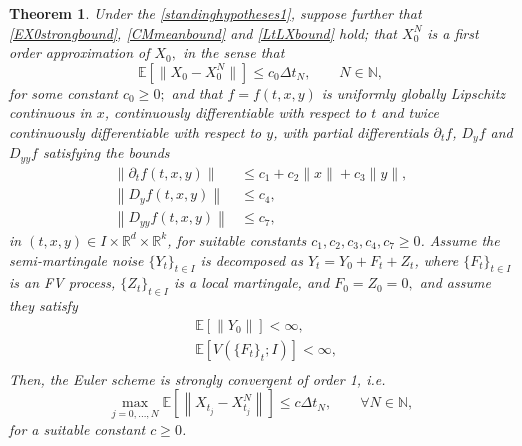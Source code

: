 \documentclass[reqno,12pt]{amsart}
\theoremstyle{plain} %
\newtheorem{theorem}{Theorem}[section]
\theoremstyle{definition} %
\begin{document}
\begin{theorem}
    \label{thmsemimartingale}
    Under the \cref{standinghypotheses1}, suppose further that \eqref{EX0strongbound}, \eqref{CMmeanbound} and \eqref{LtLXbound} hold; that $X_0^N$ is a first order approximation of $X_0,$ in the sense that 
    \begin{equation}
        \label{EX0X0Nunif}
        \mathbb{E}[\|X_0 - X_0^N\|] \leq c_0 \Delta t_N, \qquad N\in \mathbb{N},
    \end{equation}
    for some constant $c_0 \geq 0;$ and that $f=f(t, x, y)$ is uniformly globally Lipschitz continuous in $x$, continuously differentiable with respect to $t$ and twice continuously differentiable with respect to $y$, with partial differentials $\partial_t f$, $D_y f$ and $D_{yy} f$ satisfying the bounds
    \begin{align}
        \label{ftfyunifboundcadlagfvpartialt}
        \left\|\partial_t f(t, x, y)\right\| & \leq c_1 + c_2\|x\| + c_3\|y\|, \\
        \label{ftfyunifboundcadlagfvpartialy}
        \left\|D_y f(t, x, y)\right\| & \leq c_4, \\
        \label{ftfyunifboundcadlagfvpartialyy}
        \left\|D_{yy} f(t, x, y)\right\| & \leq c_7,
    \end{align}
    in $(t, x, y)\in I\times \mathbb{R}^d\times \mathbb{R}^k$, for suitable constants $c_1, c_2, c_3, c_4, c_7 \geq 0$. Assume the semi-martingale noise $\{Y_t\}_{t\in I}$ is decomposed as $Y_t = Y_0 + F_t + Z_t$, where $\{F_t\}_{t\in I}$ is an FV process, $\{Z_t\}_{t\in I}$ is a local martingale, and $F_0 = Z_0 = 0,$ and assume they satisfy
    \begin{align}
        \label{Y0finiteexpectation}
        & \mathbb{E}\left[\|Y_0\|\right] < \infty, \\
        \label{expectFVFtfinite}
        & \mathbb{E}\left[V(\{F_t\}_t; I)\right] < \infty, \\
    \end{align}   
    Then, the Euler scheme is strongly convergent of order 1, i.e.
    \begin{equation}
        \label{ordersemimartingaleunif}
        \max_{j=0, \ldots, N} \mathbb{E}\left[\left\| X_{t_j} - X_{t_j}^N \right\|\right] \leq c \Delta t_N, \qquad \forall N \in \mathbb{N},
    \end{equation}
    for a suitable constant $c\geq 0$.
\end{theorem}
\end{document}
